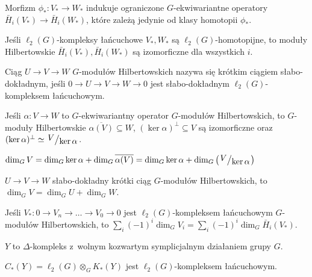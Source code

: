 \begin{wniosek}
	Morfizm $\phi_\ast:V_\ast \to W_\ast$ indukuje ograniczone
	$G$-ekwiwariantne operatory 
	$\bar{H}_i(V_\ast) \to \bar{H}_i(W_\ast)$,
	które zależą jedynie od klasy homotopii $\phi_\ast$.
\end{wniosek}

\begin{wniosek}
	Jeśli $\ell_2(G)$-kompleksy łańcuchowe $V_\ast, W_\ast$ są 
	$\ell_2(G)$-homotopijne, to moduły Hilbertowskie
	$\bar{H}_i(V_\ast), \bar{H}_i(W_\ast)$
	są izomorficzne dla wszystkich $i$.
\end{wniosek}

\begin{definicja}
	Ciąg $U \to V \to W$ $G$-modułów Hilbertowskich nazywa się
	krótkim ciągiem słabo-dokładnym, jeśli
	$0\to U \to V \to W \to 0$ jest słabo-dokładnym
	$\ell_2(G)$-kompleksem łańcuchowym.
\end{definicja}

\begin{fakt}
	Jeśli $\alpha:V \to W$ to $G$-ekwiwariantny operator 
	$G$-modułów Hilbertowskich, to $G$-moduły Hilbertowskie
	$\overline{\alpha(V)} \subseteq W$, 
	$(\ker \alpha)^\perp \subseteq V$ są izomorficzne
	oraz $(\ker \alpha)^\perp \simeq \bigslant V {\ker \alpha}$.
\end{fakt}

\begin{wniosek}
	$\dim_G V = {\dim_G \ker \alpha + \dim_G \overline{\alpha(V)}}
	= {\dim_G \ker \alpha + \dim_G \left( \bigslant V {\ker \alpha} \right) }$
\end{wniosek}

\begin{wniosek}
	$U \to V \to W$ słabo-dokładny krótki ciąg 
	$G$-modułów Hilbertowskich, to 
	$\dim_G V = \dim_G U + \dim_G W$.
\end{wniosek}

\begin{wniosek}
	Jeśli $V_\ast : 0 \to V_n \to  \ldots \to V_0 \to 0$ jest
	$\ell_2(G)$-kompleksem łańcuchowym $G$-modułów Hilbertowskich,
	to ${\sum_i (-1)^i \dim_G V_i = \sum_i (-1)^i \dim_G \bar{H}_i(V_\ast)}$.
\end{wniosek}

$Y$ to $\Delta$-kompleks z~wolnym kozwartym symplicjalnym 
działaniem grupy $G$.

\begin{stwierdzenie}
	$C_\ast(Y) = \ell_2(G) \otimes_G K_\ast(Y)$ jest 
	$\ell_2(G)$-kompleksem łańcuchowym.
\end{stwierdzenie}

